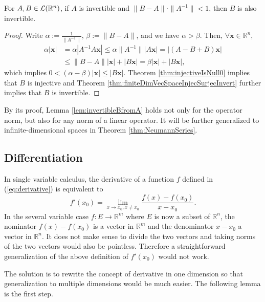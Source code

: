 \begin{lem}
  \label{lem:invertibleBfromA}
  For $A,B\in {\cal L}(\mathbb{R}^n)$,
  if $A$ is invertible and $\|B-A\|\cdot\|A^{-1}\|<1$,
  then $B$ is also invertible.
\end{lem}
\begin{proof}
  Write $\alpha := \frac{1}{\|A^{-1}\|}$, $\beta := \|B-A\|$,
  and we have $\alpha>\beta$. 
  Then, $\forall \mathbf{x}\in\mathbb{R}^n$,
  \begin{displaymath}
    \begin{array}{rl}
      \alpha |\mathbf{x}|
      &= \alpha|A^{-1}A \mathbf{x}|
        \le \alpha\|A^{-1}\| |A\mathbf{x}|
        = |(A-B+B)\mathbf{x}|
      \\
      & \le \|B-A\||\mathbf{x}| + |B\mathbf{x}|
        = \beta |\mathbf{x}| + |B\mathbf{x}|, 
    \end{array}
  \end{displaymath}
  which implies $0< (\alpha-\beta)|\mathbf{x}|\le |B\mathbf{x}|$.
  Theorem \ref{thm:injectiveIsNull0} implies that
  $B$ is injective and
  Theorem \ref{thm:finiteDimVecSpaceInjecSurjecInvert}
  further implies that $B$ is invertible.
\end{proof}

\begin{rem}
  By its proof, Lemma \ref{lem:invertibleBfromA} holds not only
  for the operator norm,
  but also for any norm of a linear operator. 
  It will be further generalized to infinite-dimensional spaces
  in Theorem \ref{thm:NeumannSeries}.
\end{rem}


\subsection{Differentiation}

\begin{rem}
  \label{rem:singleVarDiff2MultiVarDiff}
  In single variable calculus,
  the derivative of a function $f$ defined in (\ref{eq:derivative})
  is equivalent to 
  \begin{displaymath}
    f'(x_0)=\lim_{x\rightarrow x_0, x\ne x_0} \frac{f(x)-f(x_0)}{x-x_0}.
  \end{displaymath}
  In the several variable case $f: E\rightarrow \mathbb{R}^m$
  where $E$ is now a subset of $\mathbb{R}^n$,
  the nominator $f(x)-f(x_0)$ is a vector in $\mathbb{R}^m$
  and the denominator $x-x_0$ a vector in $\mathbb{R}^n$.
  It does not make sense to divide the two vectors and
   taking norms of the two vectors would also be pointless.
  Therefore a straightforward generalization
  of the above definition of $f'(x_0)$ would not work.

  The solution is to rewrite the concept of derivative
  in one dimension so that generalization to multiple dimensions
  would be much easier.
  The following lemma is the first step.
\end{rem}

